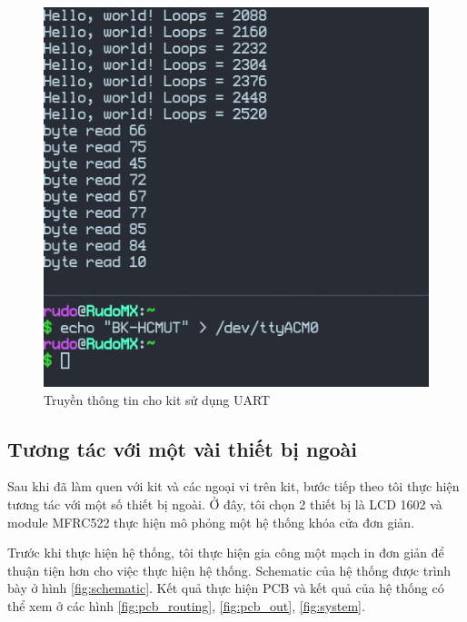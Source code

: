 \begin{figure}[ht]
\centering
\includegraphics[scale=0.5]{images/cycle_uart_read.png}
\caption{Truyền thông tin cho kit sử dụng UART}
\label{fig:cycle_uart_read}
\end{figure}

\clearpage
\subsection{Tương tác với một vài thiết bị ngoài}\label{lbl:rust_mfrc522}
Sau khi đã làm quen với kit và các ngoại vi trên kit, bước tiếp theo tôi thực hiện tương tác với một số thiết bị ngoài.
Ở đây, tôi chọn 2 thiết bị là LCD 1602 \cite{lcd_datasheet} và module MFRC522 \cite{mfrc522_datasheet} thực hiện mô phỏng một hệ thống khóa cửa đơn giản.

Trước khi thực hiện hệ thống, tôi thực hiện gia công một mạch in đơn giản để thuận tiện hơn cho việc thực hiện hệ thống.
Schematic của hệ thống được trình bày ở hình \ref{fig:schematic}.
Kết quả thực hiện PCB và kết quả của hệ thống có thể xem ở các hình \ref{fig:pcb_routing}, \ref{fig:pcb_out}, \ref{fig:system}.

